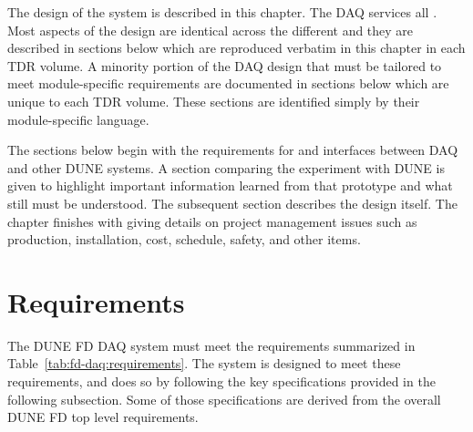 The design of the    system is described in this chapter.  The DAQ services all  .  Most  aspects of the design are identical across the different  and they are described in sections below which are reproduced verbatim in this  chapter in each  TDR volume.  A minority portion of the DAQ design that must be tailored to meet module-specific requirements are documented in sections below which are unique to each  TDR volume.  These sections are identified simply by their module-specific language.

The sections below begin with the requirements for and interfaces between DAQ and other DUNE systems.  A section comparing the  experiment with DUNE is given to highlight important information learned from that prototype and what still must be understood.  The subsequent section describes the design itself.  The chapter finishes with giving details on project management issues such as production, installation, cost, schedule, safety, and other items.

\section{Requirements}
\label{sec:fd-daq:requirements}


The DUNE FD DAQ system must meet the requirements 
summarized in Table~\ref{tab:fd-daq:requirements}. The system is
designed to meet these requirements, and does so by following the key
specifications provided in the following subsection. Some of those
specifications are derived from the overall DUNE FD top level requirements.

